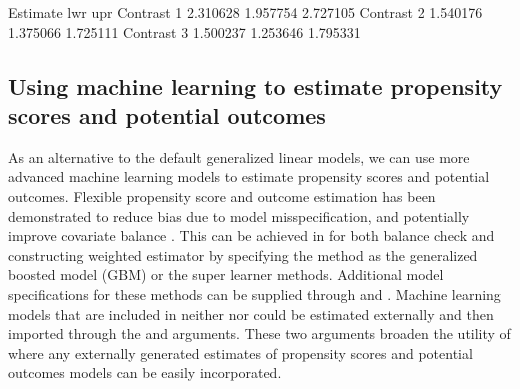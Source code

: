 
\begin{Soutput}
          Estimate      lwr      upr
Contrast 1 2.310628 1.957754 2.727105
Contrast 2 1.540176 1.375066 1.725111
Contrast 3 1.500237 1.253646 1.795331
\end{Soutput}

\subsection{Using machine learning to estimate propensity scores and potential outcomes}\label{sec:impillu}

As an alternative to the default generalized linear models, we can use more advanced machine learning models to estimate propensity scores and potential outcomes. Flexible propensity score and outcome estimation has been demonstrated to reduce bias due to model misspecification, and potentially improve covariate balance \citep{lee2010improving,hill2011bayesian,McCaffrey2013}. This can be achieved in  for both balance check and constructing weighted estimator by specifying the method as the generalized boosted model (GBM) or the super learner methods.  Additional model specifications for these methods can be supplied through  and . Machine learning models that are included in neither  nor  could be estimated externally and then imported through the  and  arguments. These two arguments broaden the utility of  where any externally generated estimates of propensity scores and potential outcomes models can be easily incorporated.

